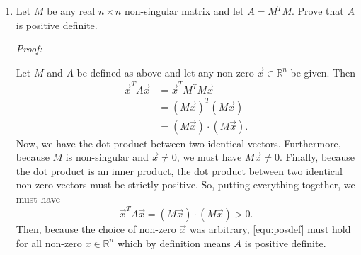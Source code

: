 \documentclass[a4paper,12pt]{article}
\newcommand{\reals}{\mathbb{R}}
\newenvironment{proof}[2][$\square$]
    {\setlength{\parskip}{0pt}\par\textit{Proof:} #2\setlength{\parskip}{0.25cm}
        \savebox{\qed}{#1}
        \begin{adjustwidth}{\widthof{Proof:}}{}
    }
    {
        \hfill\usebox{\qed}\end{adjustwidth}
    }
\begin{document}
\begin{enumerate}[label = \arabic*.]
    \item Let $ M $ be any real $ n \times n $ non-singular matrix and let $ A = M^T M $. Prove that $ A $ is positive definite.
    
    \begin{proof}{}
        Let $ M $ and $ A $ be defined as above and let any non-zero $ \vec{x} \in \reals^n $ be given. Then
        \begin{align*}
            \vec{x}^T A \vec{x} &= \vec{x}^T M^T M \vec{x} \\
            &= (M \vec{x})^T (M \vec{x}) \\
            &= (M \vec{x}) \cdot (M \vec{x}).
        \end{align*}
        Now, we have the dot product between two identical vectors. Furthermore, because $ M $ is non-singular and $ \vec{x} \neq 0 $, we must have $ M \vec{x} \neq 0 $. Finally, because the dot product is an inner product, the dot product between two identical non-zero vectors must be strictly positive. So, putting everything together, we must have
        \begin{equation}
            \vec{x}^T A \vec{x} = (M \vec{x}) \cdot (M \vec{x}) > 0. \label{equ:posdef}
        \end{equation}
        Then, because the choice of non-zero $ \vec{x} $ was arbitrary, \eqref{equ:posdef} must hold for all non-zero $ x \in \reals^n $ which by definition means $ A $ is positive definite.
    \end{proof}
\end{enumerate}
\end{document}
